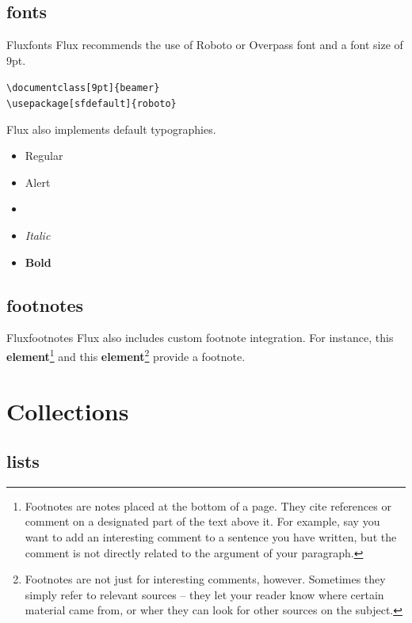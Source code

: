 \documentclass[9pt]{beamer}
\begin{document}
\subsection{fonts}

\begin{frame}[fragile]{Flux}{fonts}
 Flux recommends the use of Roboto or Overpass font and a font size of 9pt.\\[0.2cm]
 \begin{center}
 	\verb+\documentclass[9pt]{beamer}+\\
	\verb+\usepackage[sfdefault]{roboto}+
 \end{center}
 
  Flux also implements default typographies.

	\begin{itemize}
		\item Regular
		\item \alert{Alert}
		\item {}
		\item \textit{Italic}
		\item \textbf{Bold}
	\end{itemize}
	
\end{frame}

\subsection{footnotes}

\begin{frame}{Flux}{footnotes}
		Flux also includes custom footnote integration. For instance, this \textbf{element}\footnote{Footnotes are notes placed at the bottom of a page. They cite references or comment on a designated part of the text above it. For example, say you want to add an interesting comment to a sentence you have written, but the comment is not directly related to the argument of your paragraph. } and this \textbf{element}\footnote{Footnotes are not just for interesting comments, however. Sometimes they simply refer to relevant sources -- they let your reader know where certain material came from, or wher they can look for other sources on the subject.} provide a footnote.
\end{frame}

\section{Collections}
\subsection{lists}
\end{document}
